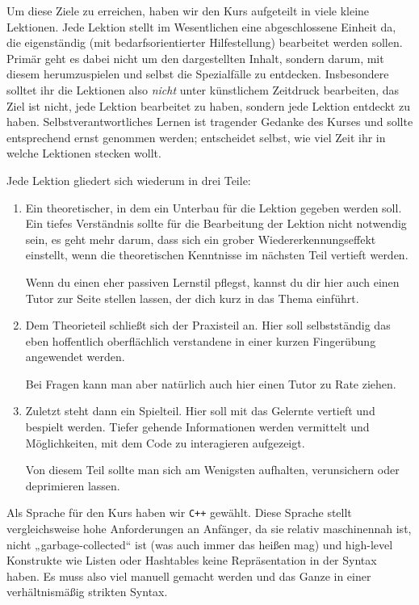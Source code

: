 \documentclass{vorkurs}
\newcommand{\swname}[1]{\texttt{#1}\xspace}
\newcommand{\Cpp}{\swname{C++}}
\begin{document}
Um diese Ziele zu erreichen, haben wir den Kurs aufgeteilt in viele kleine
Lektionen. Jede Lektion stellt im Wesentlichen eine abgeschlossene Einheit da,
die eigenständig (mit bedarfsorientierter Hilfestellung) bearbeitet werden
sollen. Primär geht es dabei nicht um den dargestellten Inhalt, sondern darum,
mit diesem herumzuspielen und selbst die Spezialfälle zu entdecken.
Insbesondere solltet ihr die Lektionen also \emph{nicht} unter künstlichem
Zeitdruck bearbeiten, das Ziel ist nicht, jede Lektion bearbeitet zu haben,
sondern jede Lektion entdeckt zu haben.  Selbstverantwortliches Lernen ist
tragender Gedanke des Kurses und sollte entsprechend ernst genommen werden;
entscheidet selbst, wie viel Zeit ihr in welche Lektionen stecken wollt.

Jede Lektion gliedert sich wiederum in drei Teile:
\begin{enumerate}
    \item Ein theoretischer, in dem ein Unterbau für die Lektion gegeben werden
          soll.  Ein tiefes Verständnis sollte für die Bearbeitung der Lektion
          nicht notwendig sein, es geht mehr darum, dass sich ein grober
          Wiedererkennungseffekt einstellt, wenn die theoretischen Kenntnisse im
          nächsten Teil vertieft werden.

          Wenn du einen eher passiven Lernstil pflegst, kannst du dir hier auch
          einen Tutor zur Seite stellen lassen, der dich kurz in das Thema
          einführt.
    \item Dem Theorieteil schließt sich der Praxisteil an.
          Hier soll selbstständig das eben hoffentlich oberflächlich verstandene
          in einer kurzen Fingerübung angewendet werden.

          Bei Fragen kann man aber natürlich auch hier einen Tutor zu Rate
          ziehen.
    \item Zuletzt steht dann ein Spielteil. Hier soll mit das Gelernte vertieft und bespielt werden.
          Tiefer gehende Informationen werden vermittelt und Möglichkeiten, mit
          dem Code zu interagieren aufgezeigt.

          Von diesem Teil sollte man sich am Wenigsten aufhalten, verunsichern
          oder deprimieren lassen.
\end{enumerate}

Als Sprache für den Kurs haben wir \Cpp gewählt.  Diese Sprache stellt
vergleichsweise hohe Anforderungen an Anfänger, da sie relativ maschinennah
ist, nicht „garbage-collected“ ist (was auch immer das heißen mag) und
high-level Konstrukte wie Listen oder Hashtables keine Repräsentation in der
Syntax haben.  Es muss also viel manuell gemacht werden und das Ganze in einer
verhältnismäßig strikten Syntax.
\end{document}
